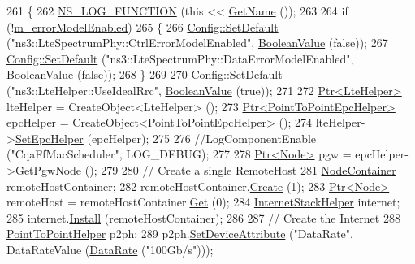 \begin{DoxyCode}
261 \{
262   \hyperlink{log-macros-disabled_8h_a90b90d5bad1f39cb1b64923ea94c0761}{NS\_LOG\_FUNCTION} (\textcolor{keyword}{this} << \hyperlink{classns3_1_1TestCase_a28f7bb59669c24dae1c290fc17fc9b62}{GetName} ());
263 
264   \textcolor{keywordflow}{if} (!\hyperlink{classLenaCqaFfMacSchedulerTestCase1_aeb7beb046b6a90eaeae3a489a01622c7}{m\_errorModelEnabled})
265     \{
266       \hyperlink{group__config_ga2e7882df849d8ba4aaad31c934c40c06}{Config::SetDefault} (\textcolor{stringliteral}{"ns3::LteSpectrumPhy::CtrlErrorModelEnabled"}, 
      \hyperlink{classns3_1_1BooleanValue}{BooleanValue} (\textcolor{keyword}{false}));
267       \hyperlink{group__config_ga2e7882df849d8ba4aaad31c934c40c06}{Config::SetDefault} (\textcolor{stringliteral}{"ns3::LteSpectrumPhy::DataErrorModelEnabled"}, 
      \hyperlink{classns3_1_1BooleanValue}{BooleanValue} (\textcolor{keyword}{false}));
268     \}
269 
270   \hyperlink{group__config_ga2e7882df849d8ba4aaad31c934c40c06}{Config::SetDefault} (\textcolor{stringliteral}{"ns3::LteHelper::UseIdealRrc"}, 
      \hyperlink{classns3_1_1BooleanValue}{BooleanValue} (\textcolor{keyword}{true}));
271 
272   \hyperlink{classns3_1_1Ptr}{Ptr<LteHelper>} lteHelper = CreateObject<LteHelper> ();
273   \hyperlink{classns3_1_1Ptr}{Ptr<PointToPointEpcHelper>}  epcHelper = CreateObject<PointToPointEpcHelper> ();
274   lteHelper->\hyperlink{classns3_1_1LteHelper_a324079a1ccd54ce949786b83d6b95915}{SetEpcHelper} (epcHelper);
275 
276   \textcolor{comment}{//LogComponentEnable ("CqaFfMacScheduler", LOG\_DEBUG);}
277 
278   \hyperlink{classns3_1_1Ptr}{Ptr<Node>} pgw = epcHelper->GetPgwNode ();
279 
280   \textcolor{comment}{// Create a single RemoteHost}
281   \hyperlink{classns3_1_1NodeContainer}{NodeContainer} remoteHostContainer;
282   remoteHostContainer.\hyperlink{classns3_1_1NodeContainer_a787f059e2813e8b951cc6914d11dfe69}{Create} (1);
283   \hyperlink{classns3_1_1Ptr}{Ptr<Node>} remoteHost = remoteHostContainer.\hyperlink{classns3_1_1NodeContainer_a9ed96e2ecc22e0f5a3d4842eb9bf90bf}{Get} (0);
284   \hyperlink{classns3_1_1InternetStackHelper}{InternetStackHelper} internet;
285   internet.\hyperlink{classns3_1_1InternetStackHelper_a6645b412f31283d2d9bc3d8a95cebbc0}{Install} (remoteHostContainer);
286 
287   \textcolor{comment}{// Create the Internet}
288   \hyperlink{classns3_1_1PointToPointHelper}{PointToPointHelper} p2ph;
289   p2ph.\hyperlink{classns3_1_1PointToPointHelper_a4577f5ab8c387e5528af2e0fbab1152e}{SetDeviceAttribute} (\textcolor{stringliteral}{"DataRate"}, DataRateValue (\hyperlink{classns3_1_1DataRate}{DataRate} (\textcolor{stringliteral}{"100Gb/s"})));

\end{DoxyCode}
